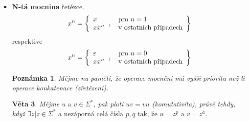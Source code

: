 \documentclass[10pt, a4paper, titlepage]{article}
\theoremstyle{note}
\newtheorem{veta}{\textbf{Věta}}
\newtheorem{poznamka}{\textbf{Poznámka}}
\begin{document}
\begin{itemize}
\begin{itemize}
\item
\textbf{Infix} řetězce. Označme jej $Ifx(x) = \lbrace y | \exists z_{1}, z_{2} \text{ tak, že } z_{1}yz_{2} = x \rbrace$.

\item
\textbf{Sufix} řetězce. Označme jej $Sfx(x) = \lbrace y | \exists z \text{ tak, že } zy = x \rbrace$.
\end{itemize}

\begin{veta}
\begin{gather*}
xy = xz \: \Longrightarrow \: y = z \\
yx = zx \: \Longrightarrow \: y = z
\end{gather*}
Algebraicky je operace zapsána jako $\langle \Sigma^{*}, \cdot, \varepsilon \rangle$.
\end{veta}

\begin{veta}
Vyslovme předpoklad, že platí $xy = uv$. Pak platí právě jedno z těchto tvrzení:
\begin{gather*}
x = u, y = v \\
|x| > |u| \text{ a } \exists w| w \neq \varepsilon, \text{ tak že } x = uw \text{ a } v = wy \\
|x| < |u| \text{ a } \exists w| w \neq \varepsilon, \text{ tak že } u = xw \text{ a } y = wv
\end{gather*}
\end{veta}

\item
\textbf{N-tá mocnina} řetězce.
$$
x^{n} = \left\lbrace
\begin{array}{l l}
x & \text{pro } n=1 \\
xx^{n-1} & \text{v ostatních případech} \\
\end{array}
\right\rbrace
$$
respektive
$$ x^{n} = \left\lbrace
\begin{array}{l l}
\varepsilon & \text{pro } n=0 \\
xx^{n-1} & \text{v ostatních případech} \\
\end{array}
\right\rbrace
$$
\begin{poznamka}
Mějme na paměti, že operace mocnění má vyšší prioritu než-li operace konkatenace (zřetězení).
\end{poznamka}

\begin{veta}
Mějme $u \text{ a } v \in \Sigma^{*}$, pak platí $uv = vu$ (komutativita), právě
tehdy, když $\exists z| z \in \Sigma^{*} \text{ a nezáporná celá čísla } p, q \text{ tak, že } u = z^{p} \text{ a } v=z^{a}$.
\end{veta}


\end{itemize}
\end{document}
